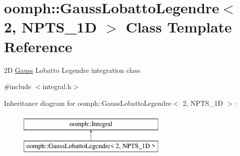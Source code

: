 \hypertarget{classoomph_1_1GaussLobattoLegendre_3_012_00_01NPTS__1D_01_4}{}\section{oomph\+:\+:Gauss\+Lobatto\+Legendre$<$ 2, N\+P\+T\+S\+\_\+1D $>$ Class Template Reference}
\label{classoomph_1_1GaussLobattoLegendre_3_012_00_01NPTS__1D_01_4}


2D \hyperlink{classoomph_1_1Gauss}{Gauss} Lobatto Legendre integration class  




{\ttfamily \#include $<$integral.\+h$>$}

Inheritance diagram for oomph\+:\+:Gauss\+Lobatto\+Legendre$<$ 2, N\+P\+T\+S\+\_\+1D $>$\+:\begin{figure}[H]
\begin{center}
\leavevmode
\includegraphics[height=2.000000cm]{classoomph_1_1GaussLobattoLegendre_3_012_00_01NPTS__1D_01_4}
\end{center}
\end{figure}
